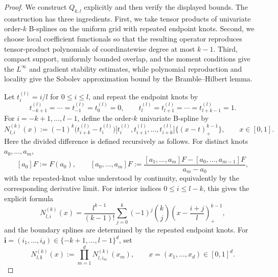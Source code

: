 \documentclass[11pt]{article}
\theoremstyle{plain}
\theoremstyle{definition}
\theoremstyle{remark}
\begin{document}
\begin{proof}
We construct \(Q_{k,l}\) explicitly and then verify the displayed bounds.
The construction has three ingredients. First, we take tensor products of
univariate order-\(k\) B-splines on the uniform grid with repeated endpoint
knots. Second, we choose local coefficient functionals so that the resulting
operator reproduces tensor-product polynomials of coordinatewise degree at
most \(k-1\). Third, compact support, uniformly bounded overlap, and the
moment conditions give the \(L^\infty\) and gradient stability estimates,
while polynomial reproduction and locality give the Sobolev approximation
bound by the Bramble--Hilbert lemma\cite{schumaker2007spline}.

Let \(t_i^{(l)}=i/l\) for \(0\le i\le l\), and repeat the endpoint knots by
\[
t_{-k+1}^{(l)}=\cdots=t_{-1}^{(l)}=t_0^{(l)}=0,
\qquad
t_l^{(l)}=t_{l+1}^{(l)}=\cdots=t_{l+k-1}^{(l)}=1.
\]
For \(i=-k+1,\dots,l-1\), define the order-\(k\) univariate B-spline by
\[
N_{l,i}^{(k)}(x):=
(-1)^k
\bigl(t_{i+k}^{(l)}-t_i^{(l)}\bigr)
\bigl[t_i^{(l)},t_{i+1}^{(l)},\dots,t_{i+k}^{(l)}\bigr]
\{(x-t)_+^{k-1}\},
\qquad x\in[0,1].
\]
Here the divided difference is defined recursively as follows. For distinct
knots \(a_0,\dots,a_m\),
\[
[a_0]F:=F(a_0),
\qquad
[a_0,\dots,a_m]F
:=
\frac{[a_1,\dots,a_m]F-[a_0,\dots,a_{m-1}]F}{a_m-a_0},
\]
with the repeated-knot value understood by continuity, equivalently by the
corresponding derivative limit. For interior indices \(0\le i\le l-k\),
this gives the explicit formula
\[
N_{l,i}^{(k)}(x)
=
\frac{l^{k-1}}{(k-1)!}
\sum_{j=0}^{k}
(-1)^j
\binom{k}{j}
\left(x-\frac{i+j}{l}\right)_+^{k-1},
\]
and the boundary splines are determined by the repeated endpoint knots.
For \(\mathbf i=(i_1,\dots,i_d)\in\{-k+1,\dots,l-1\}^d\), set
\[
N_{l,\mathbf i}^{(k)}(x)
:=
\prod_{m=1}^d N_{l,i_m}^{(k)}(x_m),
\qquad x=(x_1,\dots,x_d)\in[0,1]^d.
\]


\end{proof}
\end{document}
